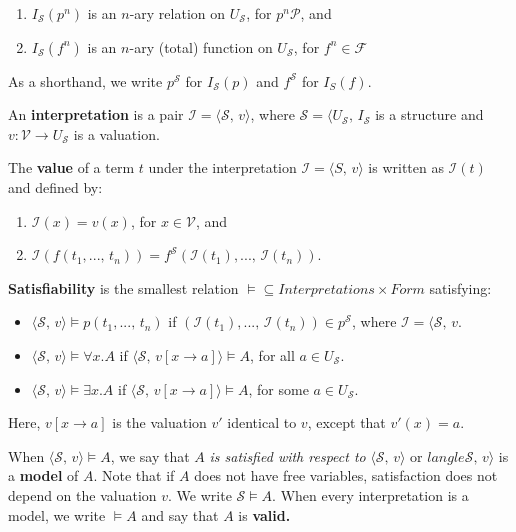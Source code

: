 \documentclass[a4paper]{extarticle}
\begin{document}
\begin{enumerate}
    \item \(I_{\mathcal{S}}(p^n)\) is an \(n\)-ary relation on \(U_{\mathcal{S}}\), for \(p^n \mathcal{P}\), and
    \item \(I_{\mathcal{S}}(f^n)\) is an \(n\)-ary (total) function on \(U_{\mathcal{S}}\), for \(f^n \in \mathcal{F}\)
\end{enumerate}

As a shorthand, we write \(p^{\mathcal{S}}\) for \(I_{\mathcal{S}}(p)\) and \(f^{\mathcal{S}}\) for \(I_{S}(f)\).

An \textbf{interpretation} is a pair \(\mathcal{I} = \langle \mathcal{S}, \, v \rangle\), where \(\mathcal{S} = \langle U_{\mathcal{S}}, \, I_{\mathcal{S}}\) is a structure and \(v : \mathcal{V} \to U_{\mathcal{S}}\) is a valuation.

The \textbf{value} of a term \(t\) under the interpretation \(\mathcal{I} = \langle S, \, v \rangle\) is written as \(\mathcal{I}(t)\) and defined by:

\begin{enumerate}
    \item \(\mathcal{I}(x) = v(x)\), for \(x \in \mathcal{V}\), and
    \item \(\mathcal{I}(f(t_1,..., \, t_n)) = f^{\mathcal{S}}(\mathcal{I}(t_1),..., \, \mathcal{I}(t_n))\).
\end{enumerate}

\textbf{Satisfiability} is the smallest relation \(\vDash \subseteq Interpretations \times Form\) satisfying:

\begin{itemize}
    \item \(\langle \mathcal{S}, \, v \rangle \vDash p(t_1,..., \, t_n)\) if \((\mathcal{I}(t_1),..., \, \mathcal{I}(t_n)) \in p^{\mathcal{S}}\), where \(\mathcal{I} = \langle \mathcal{S}, \, v\).
    \item \(\langle \mathcal{S}, \, v \rangle \vDash \forall x.A\) if \(\langle \mathcal{S}, \, v[x \to a] \rangle \vDash A\), for all \(a \in U_{\mathcal{S}}\).
    \item \(\langle \mathcal{S}, \, v \rangle \vDash \exists x.A\) if \(\langle \mathcal{S}, \, v[x \to a] \rangle \vDash A\), for some \(a \in U_{\mathcal{S}}\).
\end{itemize}

Here, \(v[x \to a]\) is the valuation \(v'\) identical to \(v\), except that \(v'(x) = a\).

When \(\langle \mathcal{S}, \, v \rangle \vDash A\), we say that \(A\) \textit{is satisfied with respect to} \(\langle \mathcal{S}, \, v \rangle\) or \(langle \mathcal{S}, \, v \rangle\) is a \textbf{model} of \(A\). Note that if \(A\) does not have free variables, satisfaction does not depend on the valuation \(v\). We write \(\mathcal{S} \vDash A\). When every interpretation is a model, we write \(\vDash A\) and say that \(A\) is \textbf{valid.}
\end{document}
